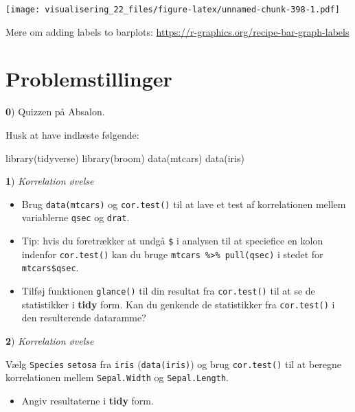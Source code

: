 \documentclass[
]{book}
\newenvironment{Shaded}{\begin{snugshade}}{\end{snugshade}}
\newcommand{\FunctionTok}[1]{\textcolor[rgb]{0.00,0.00,0.00}{#1}}
\newcommand{\NormalTok}[1]{#1}
\providecommand{\tightlist}{%
  \setlength{\itemsep}{0pt}\setlength{\parskip}{0pt}}
\begin{document}
\texttt{[image: visualisering\_22\_files/figure-latex/unnamed-chunk-398-1.pdf]}

Mere om adding labels to barplots: \url{https://r-graphics.org/recipe-bar-graph-labels}

\hypertarget{problemstillinger-7}{%
\section{Problemstillinger}\label{problemstillinger-7}}

\textbf{0}) Quizzen på Absalon.

Husk at have indlæste følgende:

\begin{Shaded}
\begin{Highlighting}[]
\FunctionTok{library}\NormalTok{(tidyverse)}
\FunctionTok{library}\NormalTok{(broom)}
\FunctionTok{data}\NormalTok{(mtcars)}
\FunctionTok{data}\NormalTok{(iris)}
\end{Highlighting}
\end{Shaded}

\textbf{1}) \emph{Korrelation øvelse}

\begin{itemize}
\item
  Brug \texttt{data(mtcars)} og \texttt{cor.test()} til at lave et test af korrelationen mellem variablerne \texttt{qsec} og \texttt{drat}.
\item
  Tip: hvis du foretrækker at undgå \texttt{\$} i analysen til at speciefice en kolon indenfor \texttt{cor.test()} kan du bruge \texttt{mtcars\ \%\textgreater{}\%\ pull(qsec)} i stedet for \texttt{mtcars\$qsec}.
\item
  Tilføj funktionen \texttt{glance()} til din resultat fra \texttt{cor.test()} til at se de statistikker i \textbf{tidy} form. Kan du genkende de statistikker fra \texttt{cor.test()} i den resulterende dataramme?
\end{itemize}

\textbf{2}) \emph{Korrelation øvelse}

Vælg \texttt{Species} \texttt{setosa} fra \texttt{iris} (\texttt{data(iris)}) og brug \texttt{cor.test()} til at beregne korrelationen mellem \texttt{Sepal.Width} og \texttt{Sepal.Length}.

\begin{itemize}
\tightlist
\item
  Angiv resultaterne i \textbf{tidy} form.
\end{itemize}
\end{document}
